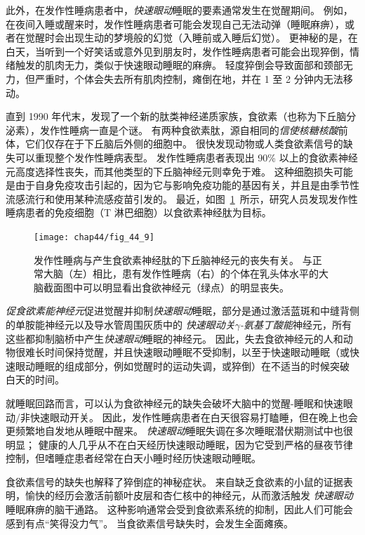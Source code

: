 此外，在发作性睡病患者中，\textit{快速眼动}睡眠的要素通常发生在觉醒期间。
例如，在夜间入睡或醒来时，发作性睡病患者可能会发现自己无法动弹（睡眠麻痹），或者在觉醒时会出现生动的梦境般的幻觉（入睡前或入睡后幻觉）。
更神秘的是，在白天，当听到一个好笑话或意外见到朋友时，发作性睡病患者可能会出现猝倒，情绪触发的肌肉无力，类似于快速眼动睡眠的麻痹。
轻度猝倒会导致面部和颈部无力，但严重时，个体会失去所有肌肉控制，瘫倒在地，并在 1 至 2 分钟内无法移动。


直到 1990 年代末，发现了一个新的肽类神经递质家族，食欲素（也称为下丘脑分泌素），发作性睡病一直是个谜。
有两种食欲素肽，源自相同的\textit{信使核糖核酸}前体，它们仅存在于下丘脑后外侧的细胞中。
很快发现动物或人类食欲素信号的缺失可以重现整个发作性睡病表型。
发作性睡病患者表现出 90\% 以上的食欲素神经元高度选择性丧失，而其他类型的下丘脑神经元则幸免于难。
这种细胞损失可能是由于自身免疫攻击引起的，因为它与影响免疫功能的基因有关，并且是由季节性流感流行和使用某种流感疫苗引发的。
最近，如图~\ref{fig:44_9}~所示，研究人员发现发作性睡病患者的免疫细胞（T 淋巴细胞）以食欲素神经肽为目标。


\begin{figure}[htbp]
	\centering
	\texttt{[image: chap44/fig\_44\_9]}
	\caption{发作性睡病与产生食欲素神经肽的下丘脑神经元的丧失有关。
		与正常大脑（左）相比，患有发作性睡病（右）的个体在乳头体水平的大脑截面图中可以明显看出食欲神经元（绿点）的明显丧失\cite{crocker2005concomitant}。}
	\label{fig:44_9}
\end{figure}


\textit{促食欲素能神经元}促进觉醒并抑制\textit{快速眼动}睡眠，部分是通过激活蓝斑和中缝背侧的单胺能神经元以及导水管周围灰质中的 \textit{快速眼动关}\textit{$\gamma$-氨基丁酸能}神经元，所有这些都抑制脑桥中产生\textit{快速眼动}睡眠的神经元。
因此，失去食欲神经元的人和动物很难长时间保持觉醒，并且快速眼动睡眠不受抑制，以至于快速眼动睡眠（或快速眼动睡眠的组成部分，例如觉醒时的运动失调，或猝倒）在不适当的时候突破 白天的时间。


就睡眠回路而言，可以认为食欲神经元的缺失会破坏大脑中的觉醒-睡眠和快速眼动/非快速眼动开关。
因此，发作性睡病患者在白天很容易打瞌睡，但在晚上也会更频繁地自发地从睡眠中醒来。
\textit{快速眼动}睡眠失调在多次睡眠潜伏期测试中也很明显；
健康的人几乎从不在白天经历快速眼动睡眠，因为它受到严格的昼夜节律控制，但嗜睡症患者经常在白天小睡时经历快速眼动睡眠。


食欲素信号的缺失也解释了猝倒症的神秘症状。
来自缺乏食欲素的小鼠的证据表明，愉快的经历会激活前额叶皮层和杏仁核中的神经元，从而激活触发 \textit{快速眼动}睡眠麻痹的脑干通路。
这种影响通常会受到食欲素系统的抑制，因此人们可能会感到有点“笑得没力气”。
当食欲素信号缺失时，会发生全面瘫痪。


